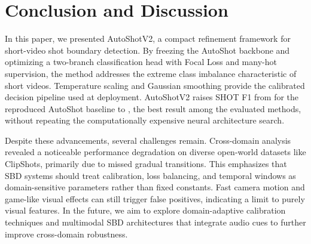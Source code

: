 \section{Conclusion and Discussion}

In this paper, we presented AutoShotV2, a compact refinement framework for short-video shot boundary detection. By freezing the AutoShot backbone and optimizing a two-branch classification head with Focal Loss and many-hot supervision, the method addresses the extreme class imbalance characteristic of short videos. Temperature scaling and Gaussian smoothing provide the calibrated decision pipeline used at deployment. AutoShotV2 raises SHOT F1 from \PaperAutoShotShotFOne{} for the reproduced AutoShot baseline to \PaperASVTwoShotFOne, the best result among the evaluated methods, without repeating the computationally expensive neural architecture search.

Despite these advancements, several challenges remain. Cross-domain analysis revealed a noticeable performance degradation on diverse open-world datasets like ClipShots, primarily due to missed gradual transitions. This emphasizes that SBD systems should treat calibration, loss balancing, and temporal windows as domain-sensitive parameters rather than fixed constants. Fast camera motion and game-like visual effects can still trigger false positives, indicating a limit to purely visual features. In the future, we aim to explore domain-adaptive calibration techniques and multimodal SBD architectures that integrate audio cues to further improve cross-domain robustness.
